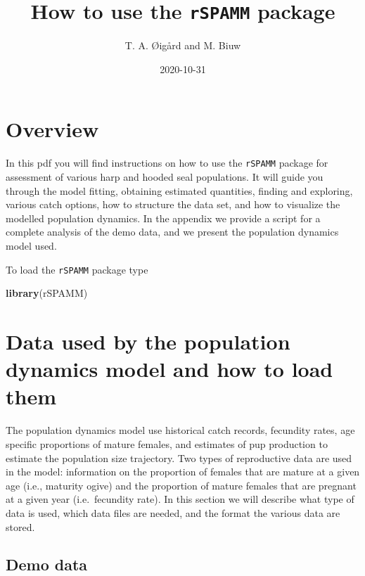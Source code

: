 \documentclass[
]{article}
\title{How to use the \texttt{rSPAMM} package}
\author{T. A. Øigård and M. Biuw}
\date{2020-10-31}
\newenvironment{Shaded}{\begin{snugshade}}{\end{snugshade}}
\newcommand{\KeywordTok}[1]{\textcolor[rgb]{0.13,0.29,0.53}{\textbf{#1}}}
\newcommand{\NormalTok}[1]{#1}
\begin{document}
\maketitle

\hypertarget{overview}{%
\section{Overview}\label{overview}}

In this pdf you will find instructions on how to use the \texttt{rSPAMM}
package for assessment of various harp and hooded seal populations. It
will guide you through the model fitting, obtaining estimated
quantities, finding and exploring, various catch options, how to
structure the data set, and how to visualize the modelled population
dynamics. In the appendix we provide a script for a complete analysis of
the demo data, and we present the population dynamics model used.

To load the \texttt{rSPAMM} package type

\begin{Shaded}
\begin{Highlighting}[]
\KeywordTok{library}\NormalTok{(rSPAMM)}
\end{Highlighting}
\end{Shaded}

\hypertarget{data-used-by-the-population-dynamics-model-and-how-to-load-them}{%
\section{Data used by the population dynamics model and how to load
them}\label{data-used-by-the-population-dynamics-model-and-how-to-load-them}}

The population dynamics model use historical catch records, fecundity
rates, age specific proportions of mature females, and estimates of pup
production to estimate the population size trajectory. Two types of
reproductive data are used in the model: information on the proportion
of females that are mature at a given age (i.e., maturity ogive) and the
proportion of mature females that are pregnant at a given year
(i.e.~fecundity rate). In this section we will describe what type of
data is used, which data files are needed, and the format the various
data are stored.

\hypertarget{demo-data}{%
\subsection{Demo data}\label{demo-data}}
\end{document}
